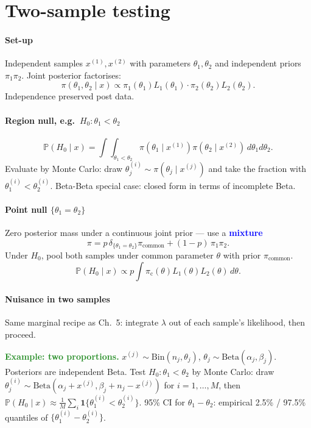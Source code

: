 
\section{Two-sample testing}

\paragraph{Set-up}
Independent samples $x^{(1)},x^{(2)}$ with parameters $\theta_1,\theta_2$ and independent priors $\pi_1\pi_2$. Joint posterior factorises:
\[\pi(\theta_1,\theta_2\mid x)\propto \pi_1(\theta_1)L_1(\theta_1)\cdot \pi_2(\theta_2)L_2(\theta_2).\]
\textcolor{Bittersweet}{Independence preserved} post data.

\paragraph{Region null, e.g.\ $H_0:\theta_1<\theta_2$}
\[\mathbb{P}(H_0\mid x)=\!\int\!\!\int_{\theta_1<\theta_2}\!\pi(\theta_1\mid x^{(1)})\pi(\theta_2\mid x^{(2)})\,d\theta_1 d\theta_2.\]
Evaluate by Monte Carlo: draw $\theta_j^{(i)}\sim\pi(\theta_j\mid x^{(j)})$ and take the fraction with $\theta_1^{(i)}<\theta_2^{(i)}$. \textcolor{Bittersweet}{Beta-Beta special case}: closed form in terms of incomplete Beta.

\paragraph{Point null $\{\theta_1=\theta_2\}$}
Zero posterior mass under a continuous joint prior — use a \textcolor{Blue}{\textbf{mixture}}
\[\pi=p\,\delta_{\{\theta_1=\theta_2\}}\pi_{\text{common}}+(1-p)\,\pi_1\pi_2.\]
Under $H_0$, pool both samples under common parameter $\theta$ with prior $\pi_{\text{common}}$.
\[\mathbb{P}(H_0\mid x)\propto p\!\int \pi_{\text{c}}(\theta)L_1(\theta)L_2(\theta)\,d\theta.\]

\paragraph{Nuisance in two samples}
Same marginal recipe as Ch.\ 5: integrate $\lambda$ out of each sample's likelihood, then proceed.

\textcolor{ForestGreen}{\textbf{Example: two proportions.}} $x^{(j)}\sim\mathrm{Bin}(n_j,\theta_j)$, $\theta_j\sim\mathrm{Beta}(\alpha_j,\beta_j)$. Posteriors are independent Beta. Test $H_0:\theta_1<\theta_2$ by Monte Carlo: draw $\theta_j^{(i)}\sim\mathrm{Beta}(\alpha_j+x^{(j)},\beta_j+n_j-x^{(j)})$ for $i=1,\ldots,M$, then $\mathbb{P}(H_0\mid x)\approx \tfrac{1}{M}\sum_i \mathbf{1}\{\theta_1^{(i)}<\theta_2^{(i)}\}$. 95\% CI for $\theta_1-\theta_2$: empirical 2.5\% / 97.5\% quantiles of $\{\theta_1^{(i)}-\theta_2^{(i)}\}$.
